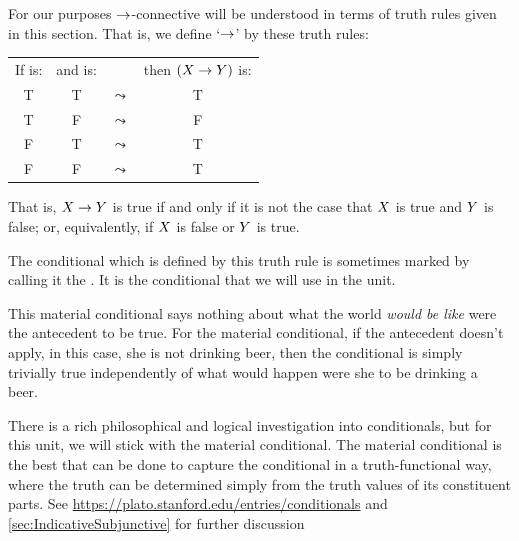 
For our purposes $\rightarrow$-connective will be understood in terms of truth rules given in this section.
That is, we define `$\rightarrow$' by these truth rules:

	\begin{center}
		\begin{tabular}{cccc}
			If \metaX is:&and \metaY is:&&then $(X\rightarrow Y)$ is:\\
			T & T &$\leadsto$& T\\
			T & F &$\leadsto$& F\\
			F & T &$\leadsto$& T\\
			F & F &$\leadsto$& T
		\end{tabular}
	\end{center}
	That is, $X\rightarrow Y$ is true if and only if it is not the case that $X$ is true and $Y$ is false; or, equivalently, if $X$ is false or $Y$ is true.

The conditional which is defined by this truth rule is sometimes marked by calling it the . It is the conditional that we will use in the unit. 

This material conditional says nothing about what the world \emph{would be like} were the antecedent to be true. For the material conditional, if the antecedent doesn't apply, in this case, she is not drinking beer, then the conditional is simply trivially true independently of what would happen were she to be drinking a beer. 

There is a rich philosophical and logical investigation into conditionals, but for this unit, we will stick with the material conditional.
The material conditional is the best that can be done to capture the conditional in a truth-functional way, where the truth can be determined simply from the truth values of its constituent parts. 
 See \url{https://plato.stanford.edu/entries/conditionals} and \cref{sec:IndicativeSubjunctive} for further discussion

